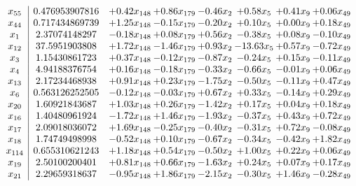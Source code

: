 \documentclass[8pt]{article}
\begin{document}
\[\begin{array}{c| c c@{\hskip 2pt} c@{\hskip 2pt} c@{\hskip 2pt} c@{\hskip 2pt} c@{\hskip 2pt} c@{\hskip 2pt} }
 x_{55}   &  0.476953907816 & +  0.42 x_{148} & +  0.86 x_{179} & -0.46 x_{2} & +  0.58 x_{5} & +  0.41 x_{9} & +  0.06 x_{49}\\
 x_{44}   &  0.717434869739 & +  1.25 x_{148} & -0.15 x_{179} & -0.20 x_{2} & +  0.10 x_{5} & +  0.00 x_{9} & +  0.18 x_{49}\\
 x_{1}   &  2.37074148297 & -0.18 x_{148} & +  0.08 x_{179} & +  0.56 x_{2} & -0.38 x_{5} & +  0.08 x_{9} & -0.10 x_{49}\\
 x_{12}   &  37.5951903808 & +  1.72 x_{148} & -1.46 x_{179} & +  0.93 x_{2} & -13.63 x_{5} & +  0.57 x_{9} & -0.72 x_{49}\\
 x_{3}   &  1.15430861723 & +  0.37 x_{148} & -0.12 x_{179} & -0.87 x_{2} & -0.24 x_{5} & +  0.15 x_{9} & -0.11 x_{49}\\
 x_{4}   &  4.94188376754 & +  0.16 x_{148} & -0.18 x_{179} & -0.33 x_{2} & -0.66 x_{5} & -0.01 x_{9} & +  0.06 x_{49}\\
 x_{13}   &  2.17234468938 & +  0.91 x_{148} & +  0.23 x_{179} & -1.75 x_{2} & -0.50 x_{5} & -0.11 x_{9} & +  0.47 x_{49}\\
 x_{6}   &  0.563126252505 & -0.12 x_{148} & -0.03 x_{179} & +  0.67 x_{2} & +  0.33 x_{5} & -0.14 x_{9} & +  0.29 x_{49}\\
 x_{20}   &  1.60921843687 & +  1.03 x_{148} & +  0.26 x_{179} & -1.42 x_{2} & +  0.17 x_{5} & +  0.04 x_{9} & +  0.18 x_{49}\\
 x_{16}   &  1.40480961924 & -1.72 x_{148} & +  1.46 x_{179} & -1.93 x_{2} & -0.37 x_{5} & +  0.43 x_{9} & +  0.72 x_{49}\\
 x_{17}   &  2.09018036072 & +  1.69 x_{148} & -0.25 x_{179} & -0.40 x_{2} & -0.31 x_{5} & +  0.72 x_{9} & -0.08 x_{49}\\
 x_{18}   &  1.74749498998 & -0.52 x_{148} & +  0.10 x_{179} & -0.67 x_{2} & -0.34 x_{5} & -0.42 x_{9} & +  1.82 x_{49}\\
 x_{114}   &  0.655310621243 & +  1.18 x_{148} & +  0.54 x_{179} & -0.50 x_{2} & +  1.00 x_{5} & +  0.22 x_{9} & +  0.06 x_{49}\\
 x_{19}   &  2.50100200401 & +  0.81 x_{148} & +  0.66 x_{179} & -1.63 x_{2} & +  0.24 x_{5} & +  0.07 x_{9} & +  0.17 x_{49}\\
 x_{21}   &  2.29659318637 & -0.95 x_{148} & +  1.86 x_{179} & -2.15 x_{2} & -0.30 x_{5} & +  1.46 x_{9} & -0.28 x_{49}\\

\end{array}\]
\end{document}
